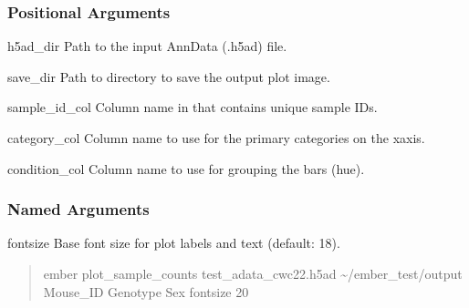 \documentclass[letterpaper,10pt,english]{sphinxmanual}
\begin{document}
\begin{sphinxVerbatim}[commandchars=\\\{\}]
  \PYG{p}{[}\PYG{p}{]} \PYG{p}{[} \PYG{p}{]}     
\end{sphinxVerbatim}


\subsubsection{Positional Arguments}
\label{\detokenize{cli:positional-arguments_repeat4}}\begin{optionlist}{3cm}
\item [h5ad\_dir]  
\sphinxAtStartPar
Path to the input AnnData (.h5ad) file.
\item [save\_dir]  
\sphinxAtStartPar
Path to directory to save the output plot image.
\item [sample\_id\_col]  
\sphinxAtStartPar
Column name in  that contains unique sample IDs.
\item [category\_col]  
\sphinxAtStartPar
Column name to use for the primary categories on the x\sphinxhyphen{}axis.
\item [condition\_col]  
\sphinxAtStartPar
Column name to use for grouping the bars (hue).
\end{optionlist}


\subsubsection{Named Arguments}
\label{\detokenize{cli:named-arguments_repeat3}}\begin{optionlist}{3cm}
\item [\sphinxhyphen{}\sphinxhyphen{}fontsize]  
\sphinxAtStartPar
Base font size for plot labels and text (default: 18).
\end{optionlist}
\begin{quote}
\begin{description}
\sphinxAtStartPar
ember plot\_sample\_counts test\_adata\_cwc22.h5ad \textasciitilde{}/ember\_test/output Mouse\_ID Genotype Sex \textendash{}fontsize 20

\end{description}
\end{quote}
\end{document}
